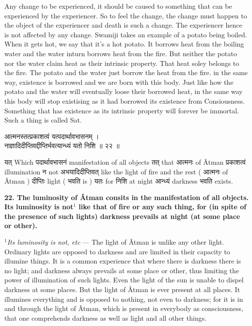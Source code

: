 \documentclass{article}
\begin{document}
\begin{oframed}

    Any change to be experienced, it should be caused to something that can be
    experienced by the experiencer. So to feel the change, the change must
    happen to the object of the experiencer and death is such a change. The
    experiencer hence is not affected by any change.  Swamiji takes an example
    of a potato being boiled. When it gets hot, we say that it's a hot potato.
    It borrows heat from the boiling water and the water inturn borrows heat
    from the fire. But neither the potato nor the water claim heat as their
    intrinsic property. That heat soley belongs to the fire. The potato and the
    water just borrow the heat from the fire. in the same way, existence is
    borrowed and we are born with this body. Just like how the potato and the
    water will eventually loose their borrowed heat, in the same way this body
    will stop existising as it had borrowed its existence from Consiousness.
    Something that has existence as its intrinsic property will forever be
    immortal. Such a thing is called Sat.

\end{oframed}

\begin{large}
\begin{center}
    \begin{hindi}
    आत्मनस्तत्प्रकाशत्वं यत्पदार्थावभासनम् ।\\
    नाज्ञादिदीप्तिवद्दीप्तिर्भवत्यान्ध्यं यतो निशि ॥ २२ ॥
    \end{hindi}
\end{center}
\end{large}

\texthindi{यत्}
Which
\texthindi{पदार्थावभासनं}
manifestation of all objects
\texthindi{तत्}
that
\texthindi{आत्मनः}
of Âtman
\texthindi{प्रकाशत्वं}
illumination
\texthindi{न}
not
\texthindi{अभयादिदीप्तिवत्}
like the light of fire and the rest (
\texthindi{आत्मनः}
of Âtman )
\texthindi{दीप्तिः}
light (
\texthindi{भवति}
is )
\texthindi{यतः}
for
\texthindi{निशि}
at night
\texthindi{आन्ध्यं}
darkness
\texthindi{भवति}
exists.

\bigskip

\textbf{22. The luminosity of Âtman consits in the manifestation of all
objects. Its luminosity is not$^1$ like that of fire or any such thing, for (in
spite of the presence of such lights) darkness prevails at night (at some place
or other).}

{\small \textit{$^1$Its luminosity is not, etc} --- The light of Âtman is
unlike any other light. Ordinary lights are opposed to darkness and are limited
in their capacity to illumine things. It is a common experience that where
there is darkness there is no light; and darkness always prevails at some place
or other, thus limiting the power of illumination of such lights. Even the
light of the sun is unable to dispel darkness at some places. But the light of
Âtman is ever present at all places. It illumines everything and is opposed to
nothing, not even to darkness; for it is in and through the light of Âtman,
which is present in everybody as consciousness, that one comprehends darkness
as well as light and all other things.}
\end{document}
